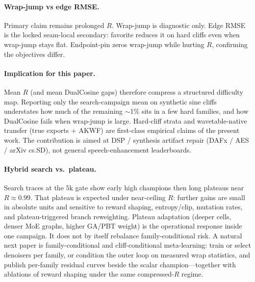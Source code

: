 \paragraph{Wrap-jump vs edge RMSE.}
Primary claim remains prolonged $R$. Wrap-jump is diagnostic only.
Edge RMSE is the locked seam-local secondary: favorite reduces it on hard cliffs even when wrap-jump stays flat.
Endpoint-pin zeros wrap-jump while hurting $R$, confirming the objectives differ.

\paragraph{Implication for this paper.}
Mean $R$ (and mean DualCosine gaps) therefore compress a structured difficulty map.
Reporting only the search-campaign mean on synthetic sine cliffs understates how much of the remaining $\sim$1\% sits in a few hard families, and how DualCosine fails when wrap-jump is large.
Hard-cliff strata and wavetable-native transfer (true exports + AKWF) are first-class empirical claims of the present work.
The contribution is aimed at DSP / synthesis artifact repair (DAFx / AES / arXiv cs.SD), not general speech-enhancement leaderboards.

\paragraph{Hybrid search vs.\ plateau.}
Search traces at the $5$k gate show early high champions then long plateaus near $R\approx 0.99$.
That plateau is expected under near-ceiling $R$: further gains are small in absolute units and sensitive to reward shaping, entropy/clip, mutation rates, and plateau-triggered branch reweighting.
Plateau adaptation (deeper cells, denser MoE graphs, higher GA/PBT weight) is the operational response inside one campaign. It does not by itself rebalance family-conditional risk.
A natural next paper is family-conditional and cliff-conditional meta-learning: train or select denoisers per family, or condition the outer loop on measured wrap statistics, and publish per-family residual curves beside the scalar champion---together with ablations of reward shaping under the same compressed-$R$ regime.

